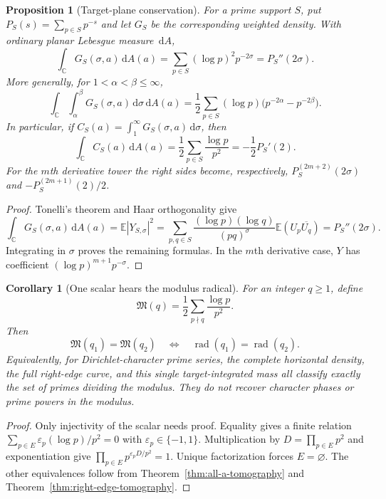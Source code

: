 \documentclass[11pt]{article}
\newtheorem{proposition}[theorem]{Proposition}
\newtheorem{corollary}[theorem]{Corollary}
\theoremstyle{definition}
\theoremstyle{remark}
\newcommand{\dd}{\,\mathrm d}
\newcommand{\eps}{\varepsilon}
\newcommand{\C}{\mathbb C}
\begin{document}
\begin{proposition}[Target-plane conservation]
\label{prop:target-mass}
For a prime support $S$, put $P_S(s)=\sum_{p\in S}p^{-s}$ and let $G_S$ be the
corresponding weighted density.  With ordinary planar Lebesgue measure $\dd A$,
\[
 \boxed{
 \int_\C G_S(\sigma,a)\dd A(a)
 =\sum_{p\in S}(\log p)^2p^{-2\sigma}=P_S''(2\sigma).
 }
\tag{5.7a}
\]
More generally, for $1<\alpha<\beta\le\infty$,
\[
 \int_\C\int_\alpha^\beta G_S(\sigma,a)\dd\sigma\dd A(a)
 =\frac12\sum_{p\in S}(\log p)
       \bigl(p^{-2\alpha}-p^{-2\beta}\bigr).
\tag{5.7b}
\]
In particular, if $C_S(a)=\int_1^\infty G_S(\sigma,a)\dd\sigma$, then
\[
 \boxed{
 \int_\C C_S(a)\dd A(a)
 =\frac12\sum_{p\in S}\frac{\log p}{p^2}=-\frac12P_S'(2).
 }
\tag{5.7c}
\]
For the $m$th derivative tower the right sides become, respectively,
$P_S^{(2m+2)}(2\sigma)$ and $-P_S^{(2m+1)}(2)/2$.
\end{proposition}

\begin{proof}
Tonelli's theorem and Haar orthogonality give
\[
 \int_\C G_S(\sigma,a)\dd A(a)
 =\mathbb E|Y_{S,\sigma}|^2
 =\sum_{p,q\in S}\frac{(\log p)(\log q)}{(pq)^\sigma}
     \mathbb E(U_p\overline{U_q})
 =P_S''(2\sigma).
\]
Integrating in $\sigma$ proves the remaining formulas.  In the $m$th derivative
case, $Y$ has coefficient $(\log p)^{m+1}p^{-\sigma}$.
\end{proof}

\begin{corollary}[One scalar hears the modulus radical]
\label{cor:modulus-tomography}
For an integer $q\ge1$, define
\[
 \mathfrak M(q)=\frac12\sum_{p\nmid q}\frac{\log p}{p^2}.
\]
Then
\[
 \boxed{
 \mathfrak M(q_1)=\mathfrak M(q_2)
 \quad\Longleftrightarrow\quad
 \operatorname{rad}(q_1)=\operatorname{rad}(q_2).
 }
\tag{5.7d}
\]
Equivalently, for Dirichlet-character prime series, the complete horizontal density,
the full right-edge curve, and this single target-integrated mass all classify exactly
the set of primes dividing the modulus.  They do not recover character phases or prime
powers in the modulus.
\end{corollary}

\begin{proof}
Only injectivity of the scalar needs proof.  Equality gives a finite relation
$\sum_{p\in E}\eps_p(\log p)/p^2=0$ with $\eps_p\in\{-1,1\}$.  Multiplication by
$D=\prod_{p\in E}p^2$ and exponentiation give
$\prod_{p\in E}p^{\eps_pD/p^2}=1$.  Unique factorization forces $E=\varnothing$.
The other equivalences follow from Theorem~\ref{thm:all-a-tomography} and
Theorem~\ref{thm:right-edge-tomography}.
\end{proof}
\end{document}
